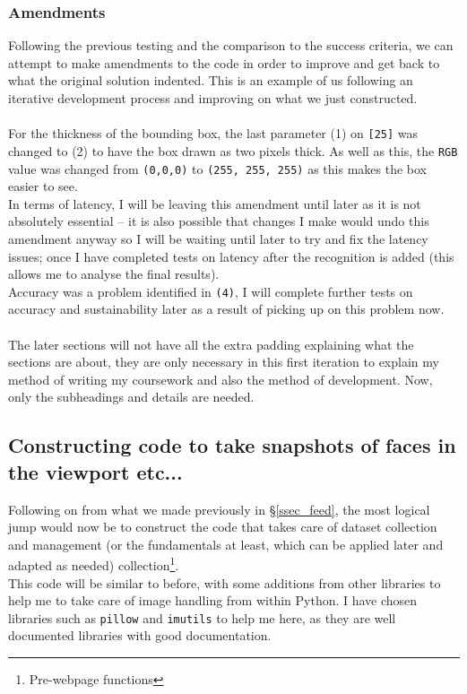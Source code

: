 \documentclass[9pt]{article}
\begin{document}
\subsubsection{Amendments}
Following the previous testing and the comparison to the success criteria, we can attempt to make amendments to the code in order to improve and get back to what the original solution indented. This is an example of us following an iterative development process and improving on what we just constructed. \\\\
For the thickness of the bounding box, the last parameter (1) on \texttt{[25]} was changed to (2) to  have the box drawn as two pixels thick. As well as this, the \texttt{RGB} value was changed from \texttt{(0,0,0)} to \texttt{(255, 255, 255)} as this makes the box easier to see.\\
In terms of latency, I will be leaving this amendment until later as it is not absolutely essential -- it is also possible that changes I make would undo this amendment anyway so I will be waiting until later to try and fix the latency issues; once I have completed tests on latency after the recognition is added (this allows me to analyse the final results). \\
Accuracy was a problem identified in \texttt{(4)}, I will complete further tests on accuracy and sustainability later as a result of picking up on this problem now. \\\\
The later sections will not have all the extra padding explaining what the sections are about, they are only necessary in this first iteration to explain my method of writing my coursework and also the method of development. Now, only the subheadings and details are needed.
















\newpage
\subsection{Constructing code to take snapshots of faces in the viewport etc...}
Following on from what we made previously in \S\ref{ssec_feed}, the most logical jump would now be to construct the code that takes care of dataset collection and management (or the fundamentals at least, which can be applied later and adapted as needed) collection\footnote{Pre-webpage functions}. \\
This code will be similar to before, with some additions from other libraries to help me to take care of image handling from within Python. I have chosen libraries such as \texttt{pillow}\cite{PIL} and \texttt{imutils}\cite{imutils} to help me here, as they are well documented libraries with good documentation.
\end{document}
